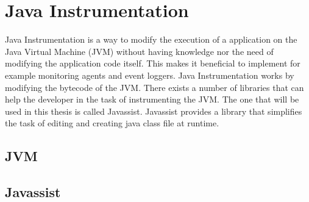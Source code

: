 \section{Java Instrumentation}
Java Instrumentation is a way to modify the execution of a application on the Java Virtual Machine (JVM) without having knowledge nor the need of modifying the application code itself. This makes it beneficial to implement for example monitoring agents and event loggers. Java Instrumentation works by modifying the bytecode of the JVM. \parencite{Java_Instrument} There exists a number of libraries that can help the developer in the task of instrumenting the JVM. The one that will be used in this thesis is called Javassist. Javassist provides a library that simplifies the task of editing and creating java class file at runtime. \parencite{Javassist}

\subsection{JVM}
\subsection{Javassist}
